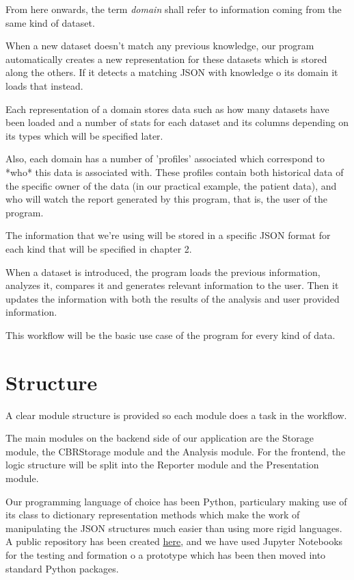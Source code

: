 From here onwards, the term \textit{domain} shall refer to information coming from the same kind of dataset.

When a new dataset doesn't match any previous knowledge, our program automatically creates a new representation for these datasets which is stored along the others. If it detects a matching JSON with knowledge o its domain it loads that instead.

Each representation of a domain stores data such as how many datasets have been loaded and a number of stats for each dataset and its columns depending on its types which will be specified later.

Also, each domain has a number of 'profiles' associated which correspond to *who* this data is associated with. These profiles contain both historical data of the specific owner of the data (in our practical example, the patient data), and who will watch the report generated by this program, that is, the user of the program.

The information that we're using will be stored in a specific JSON format for each kind that will be specified in chapter 2.

When a dataset is introduced, the program loads the previous information, analyzes it, compares it and generates relevant information to the user. Then it updates the information with both the results of the analysis and user provided information.

This workflow will be the basic use case of the program for every kind of data.

\section{Structure}
\label{cap1:sec:structure}
A clear module structure is provided so each module does a task in the workflow.

The main modules on the backend side of our application are the Storage module, the CBRStorage module and the Analysis module.
For the frontend, the logic structure will be split into the Reporter module and the Presentation module.

Our programming language of choice has been Python, particulary making use of its class to dictionary representation methods which make the work of manipulating the JSON structures much easier than using more rigid languages.
A public repository has been created \href{https://www.github.com/jorses/tfg}{here}, and we have used Jupyter Notebooks for the testing and formation o a prototype which has been then moved into standard Python packages.

